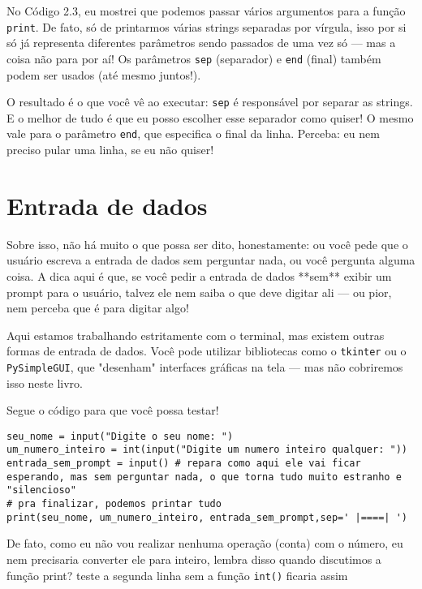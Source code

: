 \documentclass[12pt]{book}
\begin{document}
	No Código 2.3, eu mostrei que podemos passar vários argumentos para a função \texttt{print}. De fato, só de printarmos várias strings separadas por vírgula, isso por si só já representa diferentes parâmetros sendo passados de uma vez só — mas a coisa não para por aí! Os parâmetros \texttt{sep} (separador) e \texttt{end} (final) também podem ser usados (até mesmo juntos!).
	
	O resultado é o que você vê ao executar: \texttt{sep} é responsável por separar as strings. E o melhor de tudo é que eu posso escolher esse separador como quiser! O mesmo vale para o parâmetro \texttt{end}, que especifica o final da linha. Perceba: eu nem preciso pular uma linha, se eu não quiser!
	
	\section{Entrada de dados}
	
	Sobre isso, não há muito o que possa ser dito, honestamente: ou você pede que o usuário escreva a entrada de dados sem perguntar nada, ou você pergunta alguma coisa. A dica aqui é que, se você pedir a entrada de dados **sem** exibir um prompt para o usuário, talvez ele nem saiba o que deve digitar ali — ou pior, nem perceba que é para digitar algo!
	
	\begin{tcolorbox}[colback=gray!10, colframe=black, title={\large\bfseries Observação}]
		Aqui estamos trabalhando estritamente com o terminal, mas existem outras formas de entrada de dados. Você pode utilizar bibliotecas como o \texttt{tkinter} ou o \texttt{PySimpleGUI}, que "desenham" interfaces gráficas na tela — mas não cobriremos isso neste livro.
	\end{tcolorbox}
	
	Segue o código para que você possa testar!
	
	
	\begin{lstlisting}[caption={Entrada de dados}]
seu_nome = input("Digite o seu nome: ")
um_numero_inteiro = int(input("Digite um numero inteiro qualquer: "))
entrada_sem_prompt = input() # repara como aqui ele vai ficar esperando, mas sem perguntar nada, o que torna tudo muito estranho e "silencioso"
# pra finalizar, podemos printar tudo
print(seu_nome, um_numero_inteiro, entrada_sem_prompt,sep=' |====| ')\end{lstlisting}

	De fato, como eu não vou realizar nenhuma operação (conta) com o número, eu nem precisaria converter ele para inteiro, lembra disso quando discutimos a função print? teste a segunda linha sem a função \texttt{int()} ficaria assim
	
\end{document}
